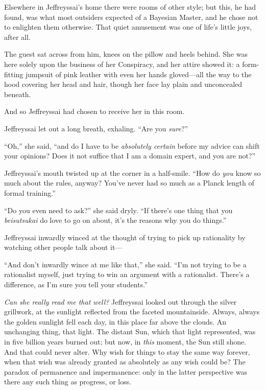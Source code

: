 {
 Elsewhere in Jeffreyssai's home there were rooms
of other style; but this, he had found, was what most outsiders
expected of a Bayesian Master, and he chose not to enlighten them
otherwise. That quiet amusement was one of life's
little joys, after all.}

{
 The guest sat across from him, knees on the pillow and heels
behind. She was here solely upon the business of her Conspiracy, and
her attire showed it: a form-fitting jumpsuit of pink leather with even
her hands gloved---all the way to the hood covering her head and hair,
though her face lay plain and unconcealed beneath.}

{
 And so Jeffreyssai had chosen to receive her in this room.}

{
 Jeffreyssai let out a long breath, exhaling.
``Are you \textit{sure}?''}

{
 ``Oh,'' she said,
``and do I have to be \textit{absolutely certain}
before my advice can shift your opinions? Does it not suffice that I am
a domain expert, and you are not?''}

{
 Jeffreyssai's mouth twisted up at the corner in a
half-smile. ``How do \textit{you} know so much about
the rules, anyway? You've never had so much as a Planck
length of formal training.''}

{
 ``Do you even need to ask?''
she said dryly. ``If there's one thing
that you \textit{beisutsukai} do love to go on about,
it's the reasons why you do
things.''}

{
 Jeffreyssai inwardly winced at the thought of trying to pick up
rationality by watching other people talk about it---}

{
 ``And don't inwardly wince at me
like that,'' she said.
``I'm not trying to be a rationalist
myself, just trying to win an argument with a rationalist.
There's a difference, as I'm sure you
tell your students.''}

{
 \textit{Can she really read me that well?} Jeffreyssai looked out
through the silver grillwork, at the sunlight reflected from the
faceted mountainside. Always, always the golden sunlight fell each day,
in this place far above the clouds. An unchanging thing, that light.
The distant Sun, which that light represented, was in five billion
years burned out; but now, in \textit{this} moment, the Sun still
shone. And that could never alter. Why wish for things to stay the same
way forever, when that wish was already granted as absolutely as any
wish could be? The paradox of permanence and impermanence: only in the
latter perspective was there any such thing as progress, or loss.}


